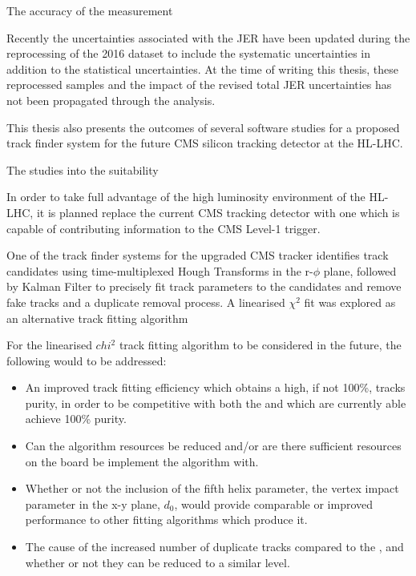 The accuracy of the measurement

Recently the uncertainties associated with the JER have been updated during the reprocessing of the 2016 dataset to include the systematic uncertainties in addition to the statistical uncertainties.
At the time of writing this thesis, these reprocessed samples and the impact of the revised total JER uncertainties has not been propagated through the analysis.


This thesis also presents the outcomes of several software studies for a proposed track finder system for the future CMS silicon tracking detector at the HL-LHC.

The studies into the suitability 

In order to take full advantage of the high luminosity environment of the HL-LHC, it is planned replace the current CMS tracking detector with one which is capable of contributing information to the CMS Level-1 trigger.

One of the track finder systems for the upgraded CMS tracker identifies track candidates using time-multiplexed Hough Transforms in the r-$\phi$ plane, followed by Kalman Filter to precisely fit track parameters to the candidates and remove fake tracks and a duplicate removal process.
A linearised $\chi^{2}$ fit was explored as an alternative track fitting algorithm



For the linearised $chi^{2}$ track fitting algorithm to be considered in the future, the following would to be addressed:
\begin{itemize}
\item An improved track fitting efficiency which obtains a high, if not 100\%, tracks purity, in order to be competitive with both the \KF and \LR which are currently able achieve 100\% purity.
\item Can the algorithm resources be reduced and/or are there sufficient resources on the board be implement the algorithm with.
\item Whether or not the inclusion of the fifth helix parameter, the vertex impact parameter in the x-y plane, $d_{0}$, would provide comparable or improved performance to other fitting algorithms which produce it.
\item The cause of the increased number of duplicate tracks compared to the \KF, and whether or not they can be reduced to a similar level.
\end{itemize}

